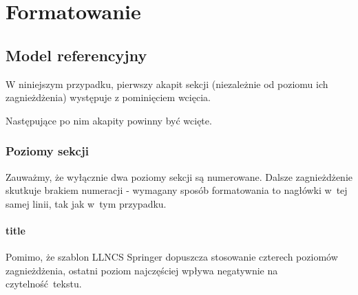 \section{Formatowanie}
\label{sec:formatting}

\subsection{Model referencyjny}
\label{subsec:refmodel}

W niniejszym przypadku, pierwszy akapit sekcji (niezależnie od poziomu ich zagnieżdżenia) występuje z pominięciem wcięcia.

Następujące po nim akapity powinny być wcięte.

\subsubsection{Poziomy sekcji}
\label{subsubsec:levels}

Zauważmy, że wyłącznie dwa poziomy sekcji są numerowane. Dalsze zagnieżdżenie skutkuje brakiem numeracji - wymagany sposób formatowania to nagłówki w~tej samej linii, tak jak w~tym przypadku.

\paragraph{title}
\label{}

Pomimo, że szablon LLNCS Springer dopuszcza stosowanie czterech poziomów zagnieżdżenia, ostatni poziom najczęściej wpływa negatywnie na czytelność tekstu.